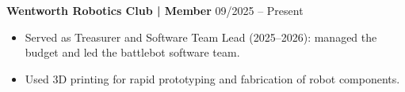 \noindent
\textbf{Wentworth Robotics Club | Member} \hfill 09/2025 -- Present
\begin{itemize}
    \item Served as Treasurer and Software Team Lead (2025--2026): managed the budget and led the battlebot software team.
    \item Used 3D printing for rapid prototyping and fabrication of robot components.
\end{itemize}
